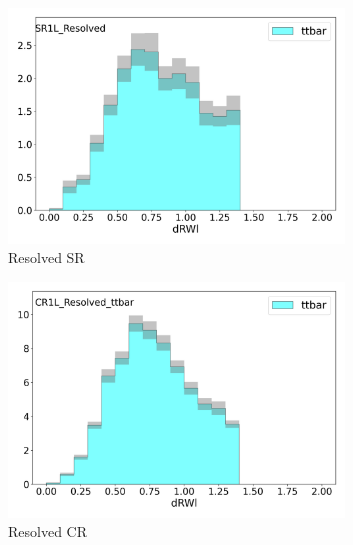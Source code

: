   \begin{figure}[htbp]
    \centering

      \begin{subfigure}{0.49\textwidth}
      \includegraphics[width = 0.98\textwidth]{Figures/4/CRSR/SR1L_Resolved/dRWl.png}
      \caption{Resolved SR \drWl}
      \end{subfigure}
      \begin{subfigure}{0.49\textwidth}
      \includegraphics[width = 0.98\textwidth]{Figures/4/CRSR/CR1L_Resolved_ttbar/dRWl.png}
      \caption{Resolved CR \drWl}
      \end{subfigure}
      \begin{subfigure}{0.49\textwidth}

\end{subfigure}
\end{figure}
